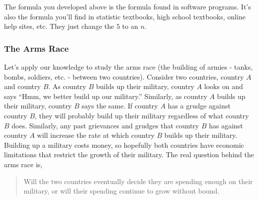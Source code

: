 The formula you developed above is the formula found in software programs.  It's also the formula you'll find in statistic textbooks, high school textbooks, online help sites, etc.  They just change the $5$ to an $n$. 





%






\mysubsection{\ideanon}
\subsubsection*{The Arms Race}
Let's apply our knowledge to study the arms race (the building of armies - tanks, bombs, soldiers, etc. - between two countries).  Consider two countries, country $A$ and country $B$. As country $B$ builds up their military, country $A$ looks on and says ``Hmm, we better build up our military.''  Similarly, as country $A$ builds up their military, country $B$ says the same. If country $A$ has a grudge against country $B$, they will probably build up their military regardless of what country $B$ does.  Similarly, any past grievances and grudges that country $B$ has against country $A$ will increase the rate at which country $B$ builds up their military. Building up a military costs money, so hopefully both countries have economic limitations that restrict the growth of their military. The real question behind the arms race is,
\begin{quote}
 Will the two countries eventually decide they are spending enough on their military, or will their spending continue to grow without bound.
\end{quote}

